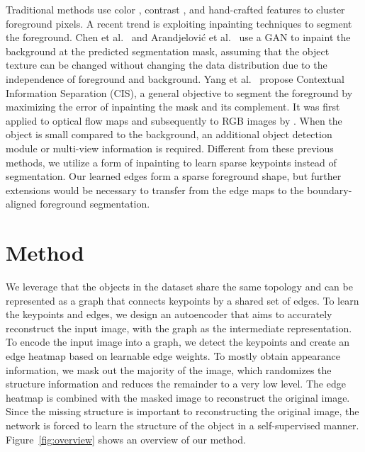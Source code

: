 \documentclass{article}
\begin{document}
\noindent{} Traditional methods use color \cite{zhu2014saliency}, contrast \cite{cheng2011global}, and hand-crafted features \cite{jiang2013salient} to cluster foreground pixels. 
A recent trend is exploiting inpainting techniques to segment the foreground. Chen et al.~\cite{chen2019unsupervised} and Arandjelovi{\'c} et al.~\cite{arandjelovic2019object} use a GAN to inpaint the background at the predicted segmentation mask, assuming that the object texture can be changed without changing the data distribution due to the independence of foreground and background. Yang et al.~\cite{yang2019unsupervised} propose Contextual Information Separation (CIS),
a general objective to segment the foreground by maximizing the error of inpainting the mask and its complement. It was first applied to optical flow maps and subsequently to RGB images by \cite{savarese2021information,yang2021dystab, katircioglu2021self}. 
When the object is small compared to the background, an additional object detection module 
\cite{katircioglu2021self,crawford2019spatially}
or  multi-view \cite{katircioglu2021human} information is required.
Different from these previous methods, we utilize a form of inpainting to learn sparse keypoints instead of segmentation. Our learned edges form a sparse foreground shape, but further extensions would be necessary to transfer from the edge maps to the boundary-aligned foreground segmentation.
 \section{Method} \label{sec:method}

We leverage that the objects in the dataset share the same topology and can be represented as a graph that connects keypoints by a shared set of edges. To learn the keypoints and edges, we design an autoencoder that aims to accurately reconstruct the input image, with the graph as the intermediate representation. To encode the input image into a graph, we detect the keypoints and create an edge heatmap based on learnable edge weights. To mostly obtain appearance information, we mask out the majority of the image, which randomizes the structure information and reduces the remainder to a very low  level.
The edge heatmap is combined with the masked image to reconstruct the original image.
Since the missing structure is important to reconstructing the original image, the network is forced to learn the structure of the object in a self-supervised manner. 
Figure~\ref{fig:overview} shows an overview of our method. 
\end{document}
